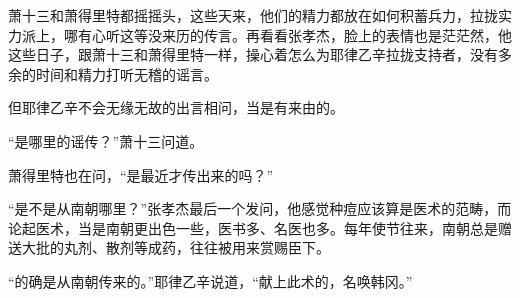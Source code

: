 萧十三和萧得里特都摇摇头，这些天来，他们的精力都放在如何积蓄兵力，拉拢实力派上，哪有心听这等没来历的传言。再看看张孝杰，脸上的表情也是茫茫然，他这些日子，跟萧十三和萧得里特一样，操心着怎么为耶律乙辛拉拢支持者，没有多余的时间和精力打听无稽的谣言。

但耶律乙辛不会无缘无故的出言相问，当是有来由的。

“是哪里的谣传？”萧十三问道。

萧得里特也在问，“是最近才传出来的吗？”

“是不是从南朝哪里？”张孝杰最后一个发问，他感觉种痘应该算是医术的范畴，而论起医术，当是南朝更出色一些，医书多、名医也多。每年使节往来，南朝总是赠送大批的丸剂、散剂等成药，往往被用来赏赐臣下。

“的确是从南朝传来的。”耶律乙辛说道，“献上此术的，名唤韩冈。”

